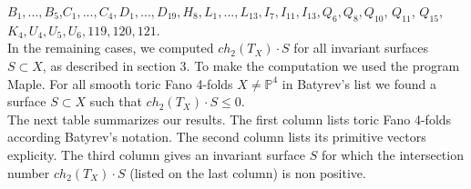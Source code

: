 \documentclass[10pt]{article}
\begin{document}
 $B_1,...,B_5$,$C_1,...,C_4,D_1,...,D_{19},H_8, L_1,...,L_{13},I_7,I_{11},I_{13},Q_6,Q_8,Q_{10}$,
 $Q_{11}$, $Q_{15}$,$K_4,U_4,U_5,U_6,119,120,121$. \\
 
In the remaining cases, we computed $ch_2(T_X)\cdot S$ for all invariant surfaces $S\subset X$, as described in section 3. To make the computation we used the program Maple. For all smooth toric Fano 4-folds $X\neq \mathbb{P}^4$ in Batyrev's list we found a surface $S\subset X$ such that $ch_2(T_X)\cdot S \leq 0$.\\


The next table summarizes our results. The first column lists toric Fano 4-folds according Batyrev's notation. The second column lists its primitive vectors explicity. The third column gives an invariant surface $S$ for which the intersection number $ch_2(T_X)\cdot S$ (listed on the last column) is non positive.\\ \\
\end{document}

